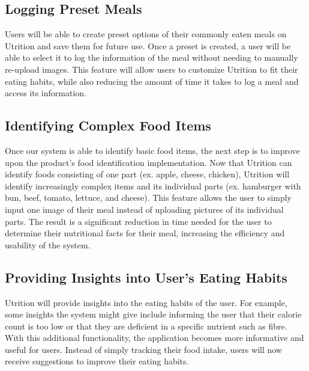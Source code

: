 \documentclass{article}
\begin{document}
\subsection{Logging Preset Meals}

Users will be able to create preset options of their commonly eaten meals on Utrition 
and save them for future use. Once a preset is created, a user will be able to 
select it to log the information of the meal without needing to manually 
re-upload images. This feature will allow users to customize Utrition to fit 
their eating habits, while also reducing the amount of time it takes to log a 
meal and access its information.

\subsection{Identifying Complex Food Items}

Once our system is able to identify basic food items, the next step is to improve upon the product's food identification implementation. Now that Utrition can identify foods consisting of one part (ex. apple, cheese, chicken), Utrition will identify increasingly complex items and its individual parts (ex. hamburger with bun, beef, tomato, lettuce, and cheese). This feature allows the user to simply input one image of their meal instead of uploading pictures of its individual parts. The result is a significant reduction in time needed for the user to determine their nutritional facts for their meal, increasing the efficiency and usability of the system.

\subsection{Providing Insights into User's Eating Habits}

Utrition will provide insights into the eating habits of the user. For example, some insights the system might give include informing the user that their calorie count is too low or that they are deficient in a specific nutrient such as fibre. With this additional functionality, the application becomes more informative and useful for users. Instead of simply tracking their food intake, users will now receive suggestions to improve their eating habits.
\end{document}
